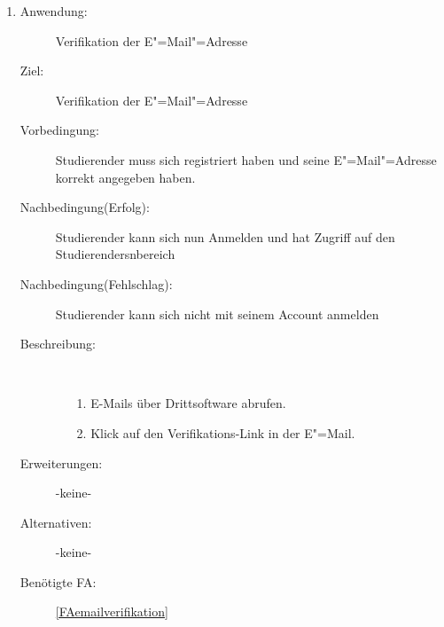\documentclass[parskip=full]{scrartcl}
\newcommand{\swtLabel}[1]{\textbf{/#1\arabic*0/}}
\begin{document}
\begin{enumerate}[label=\swtLabel{S}]
  \item \label{UCstudVerifikationEmail}
    \begin{description}
    \item[Anwendung:] Verifikation der E"=Mail"=Adresse
    \item[Ziel:] Verifikation der E"=Mail"=Adresse
    \item[Vorbedingung:] \gls{Studierender} muss sich registriert haben und seine
    E"=Mail"=Adresse korrekt angegeben haben.
    \item[Nachbedingung(Erfolg):] \gls{Studierender} kann sich nun Anmelden und hat
    Zugriff auf den \glspl{Studierender}nbereich
    \item[Nachbedingung(Fehlschlag):] \gls{Studierender} kann sich nicht mit seinem Account anmelden
    \item[Beschreibung:]~
    \begin{enumerate}
      \item[1.] E-Mails über Drittsoftware abrufen.
      \item[2.] Klick auf den Verifikations-Link in der E"=Mail.      
    \end{enumerate}
    \item[Erweiterungen:] -keine-
    \item[Alternativen:] -keine-
    \item[Benötigte FA:] \ref{FAemailverifikation}
      \end{description}
  

\end{enumerate}
\end{document}
